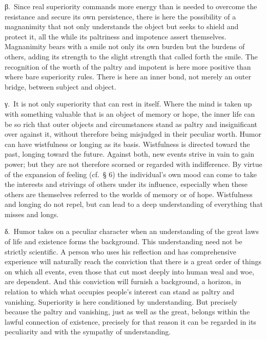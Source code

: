\documentclass[12pt]{book}
\newcommand{\opage}[1]{\marginnote{\footnotesize\textit{[#1]}}}
\begin{document}
β.~Since real superiority commands more energy than is needed to overcome the
resistance and secure its own persistence, there is here the possibility of a
magnanimity that not only understands the object but seeks to shield and protect
it, all the while its paltriness and impotence assert themselves. Magnanimity bears
with a smile not only its own burden but the burdens of others, adding its strength
to the slight strength that called forth the smile. The recognition of the worth of
the paltry and impotent is here more positive than where bare superiority rules.
There is here an inner bond, not merely an outer bridge, between subject and
object.

γ.~It is not only superiority that can rest in itself. Where the mind is taken up
with something valuable that is an object of memory or hope, the inner life can be
so rich that outer objects and circumstances stand as paltry and insignificant over
against it, without therefore being misjudged in their peculiar worth. Humor can
have wistfulness or longing as its basis. Wistfulness is directed toward the past,
longing toward the future. Against both, new events strive in vain to gain power;
but they are not therefore scorned or regarded with indifference. By virtue of the
expansion of feeling (cf.\ § 6) the individual's own mood can come to take the
interests and strivings of others under its influence, especially when these others
are themselves referred to the worlds of memory or of hope. Wistfulness and longing
do not repel, but can lead to a deep understanding of everything that misses and
longs.

δ.~Humor takes on a peculiar character when an understanding of the great laws of
life and existence forms the background. This understanding need not be strictly
scientific. A person who uses his reflection and has comprehensive experience will
\opage{54}naturally reach the conviction that there is a great order of things on
which all events, even those that cut most deeply into human weal and woe, are
dependent. And this conviction will furnish a background, a horizon, in relation to
which what occupies people's interest can stand as paltry and vanishing.
Superiority is here conditioned by understanding. But precisely because the paltry
and vanishing, just as well as the great, belongs within the lawful connection of
existence, precisely for that reason it can be regarded in its peculiarity and with
the sympathy of understanding.
\end{document}
